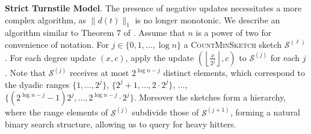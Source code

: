 \documentclass{report}
\newcommand{\algoname}[1]{\textnormal{\textsc{#1}}}
\begin{document}
\textbf{Strict Turnstile Model}.
The presence of negative updates necessitates a more complex algorithm, as $\|d(t)\|_1$ is no longer monotonic.
We describe an algorithm similar to Theorem 7 of \cite{cormode2005improved}.
Assume that $n$ is a power of two for convenience of notation.
For $j \in \{0, 1, \dots, \log n\}$ a \algoname{CountMinSketch} sketch $\mathcal{S}^{(\ell)}$.
For each degree update $(x, c)$, apply the update $\left ( \left \lfloor \frac{x}{2^j} \right \rfloor, c \right )$ to $\mathcal{S}^{(j)}$ for each $j$.
Note that $\mathcal{S}^{(j)}$ receives at most $2^{\log n - j}$ distinct elements, which correspond to the dyadic ranges $\{1, \dots, 2^j\}$, $\{2^j + 1, \dots, 2 \cdot 2^j\}$, $\dots$, $\{(2^{\log n - j} - 1) 2^j, \dots, 2^{\log n - j} \cdot 2^j\}$. 
Moreover the sketches form a hierarchy, where the range elements of $\mathcal{S}^{(j)}$ subdivide those of $\mathcal{S}^{(j+1)}$, forming a natural binary search structure, allowing us to query for heavy hitters.
\end{document}
